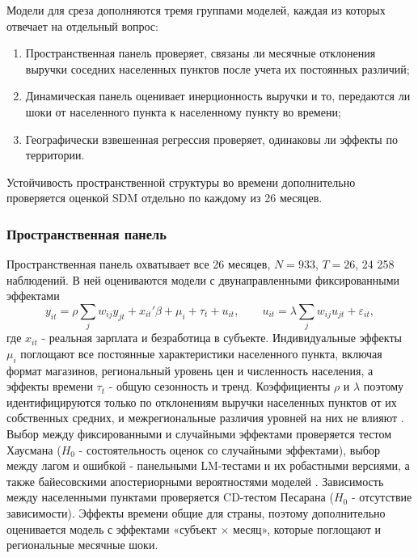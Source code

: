 \documentclass[12pt, a4paper]{article}
\begin{document}
Модели для среза дополняются тремя группами моделей, каждая из которых отвечает на отдельный
вопрос:

\begin{enumerate}
    \item Пространственная панель проверяет, связаны ли месячные отклонения выручки соседних
    населенных пунктов после учета их постоянных различий;
    \item Динамическая панель оценивает инерционность выручки и то, передаются ли шоки от
    населенного пункта к населенному пункту во времени;
    \item Географически взвешенная регрессия проверяет, одинаковы ли эффекты по территории.
\end{enumerate}

Устойчивость пространственной структуры во времени
дополнительно проверяется оценкой SDM отдельно по каждому из 26 месяцев.

\subsubsection*{Пространственная панель}

Пространственная панель охватывает все 26 месяцев, $N = 933$, $T = 26$, 24 258 наблюдений. В ней
оцениваются модели с двунаправленными фиксированными эффектами
\[
y_{it} = \rho \sum_j w_{ij} y_{jt} + x_{it}' \beta + \mu_i + \tau_t + u_{it}, \qquad
u_{it} = \lambda \sum_j w_{ij} u_{jt} + \varepsilon_{it},
\]
где $x_{it}$ - реальная зарплата и безработица в субъекте. Индивидуальные эффекты $\mu_i$
поглощают все постоянные характеристики населенного пункта, включая формат магазинов, региональный уровень
цен и численность населения, а эффекты времени $\tau_t$ - общую сезонность и тренд. Коэффициенты
$\rho$ и $\lambda$ поэтому идентифицируются только по отклонениям выручки населенных пунктов от их
собственных средних, и межрегиональные различия уровней на них не влияют
\cite{lee2010, elhorst2014}. Выбор между фиксированными и случайными эффектами проверяется тестом
Хаусмана ($H_0$ - состоятельность оценок со случайными эффектами), выбор между лагом и ошибкой -
панельными LM-тестами и их робастными версиями, а также байесовскими апостериорными
вероятностями моделей \cite{lesage2014}. Зависимость между населенными пунктами проверяется CD-тестом
Песарана \cite{pesaran2021} ($H_0$ - отсутствие зависимости). Эффекты времени общие для страны,
поэтому дополнительно оценивается модель с эффектами «субъект $\times$ месяц», которые поглощают
и региональные месячные шоки.
\end{document}

